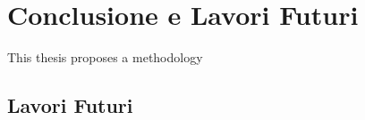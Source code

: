 
\chapter{Conclusione e Lavori Futuri}\label{chap9:Concl}
This thesis proposes a methodology 

\section{Lavori Futuri}